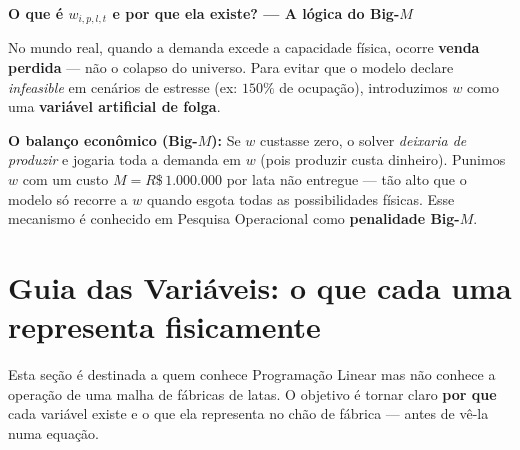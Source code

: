 \documentclass[12pt, a4paper]{article}
\begin{document}
\vspace{8pt}

\begin{mdframed}[style=destaque]
  \textbf{\color{ballblue}O que \'{e} $w_{i,p,l,t}$ e por que ela existe? --- A l\'{o}gica do Big-$M$}

  \medskip
  No mundo real, quando a demanda excede a capacidade f\'{i}sica, ocorre \textbf{venda perdida}
  --- n\~{a}o o colapso do universo. Para evitar que o modelo declare \textit{infeasible}
  em cen\'{a}rios de estresse (ex: $150\%$ de ocupa\c{c}\~{a}o), introduzimos $w$ como
  uma \textbf{vari\'{a}vel artificial de folga}.

  \medskip
  \textbf{O balan\c{c}o econ\^{o}mico (Big-$M$):} Se $w$ custasse zero, o solver
  \textit{deixaria de produzir} e jogaria toda a demanda em $w$ (pois produzir custa dinheiro).
  Punimos $w$ com um custo $M = R\$\,1.000.000$ por lata n\~{a}o entregue --- t\~{a}o alto que
  o modelo s\'{o} recorre a $w$ quando esgota todas as possibilidades f\'{i}sicas.
  Esse mecanismo \'{e} conhecido em Pesquisa Operacional como \textbf{penalidade Big-$M$}.
\end{mdframed}

\section{Guia das Vari\'{a}veis: o que cada uma representa fisicamente}

Esta se\c{c}\~{a}o \'{e} destinada a quem conhece Programa\c{c}\~{a}o Linear mas n\~{a}o
conhece a opera\c{c}\~{a}o de uma malha de f\'{a}bricas de latas. O objetivo \'{e} tornar
claro \textbf{por que} cada vari\'{a}vel existe e o que ela representa no ch\~{a}o de f\'{a}brica
--- antes de v\^{e}-la numa equa\c{c}\~{a}o.
\end{document}
